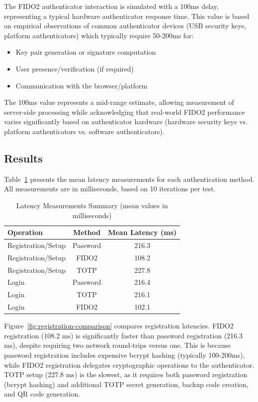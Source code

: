 The FIDO2 authenticator interaction is simulated with a 100ms delay, representing a typical hardware authenticator response time. This value is based on empirical observations of common authenticator devices (USB security keys, platform authenticators) which typically require 50-200ms for:
\begin{itemize}
    \item Key pair generation or signature computation
    \item User presence/verification (if required)
    \item Communication with the browser/platform
\end{itemize}
The 100ms value represents a mid-range estimate, allowing measurement of server-side processing while acknowledging that real-world FIDO2 performance varies significantly based on authenticator hardware (hardware security keys vs. platform authenticators vs. software authenticators).

\subsection{Results}

Table~\ref{tab:latency-results} presents the mean latency measurements for each authentication method. All measurements are in milliseconds, based on 10 iterations per test.

\begin{table}[h]
\centering
\caption{Latency Measurements Summary (mean values in milliseconds)}
\label{tab:latency-results}
\begin{tabular}{lcc}
\toprule
\textbf{Operation} & \textbf{Method} & \textbf{Mean Latency (ms)} \\
\midrule
Registration/Setup & Password & 216.3 \\
Registration/Setup & FIDO2 & 108.2 \\
Registration/Setup & TOTP & 227.8 \\
\midrule
Login & Password & 216.4 \\
Login & TOTP & 216.1 \\
Login & FIDO2 & 102.1 \\
\bottomrule
\end{tabular}
\end{table}

Figure~\ref{fig:registration-comparison} compares registration latencies. FIDO2 registration (108.2 ms) is significantly faster than password registration (216.3 ms), despite requiring two network round-trips versus one. This is because password registration includes expensive bcrypt hashing (typically 100-200ms), while FIDO2 registration delegates cryptographic operations to the authenticator. TOTP setup (227.8 ms) is the slowest, as it requires both password registration (bcrypt hashing) and additional TOTP secret generation, backup code creation, and QR code generation.

